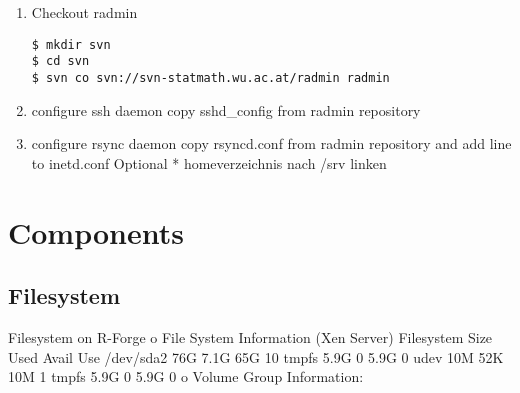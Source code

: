\documentclass[a4paper]{article}
\begin{document}
\begin{enumerate}
	\item Checkout radmin
\medskip

\begin{lstlisting}[frame=single, framerule=0.95pt]
$ mkdir svn
$ cd svn
$ svn co svn://svn-statmath.wu.ac.at/radmin radmin
\end{lstlisting}

       \item configure ssh daemon 
copy sshd\_config from radmin repository
       \item configure rsync daemon 
copy rsyncd.conf from radmin repository and add line to inetd.conf
Optional * homeverzeichnis nach /srv linken
\end{enumerate}
\section{Components}
\label{sec:registration}
\subsection{Filesystem}
Filesystem on R-Forge 
o File System Information (Xen Server)
		Filesystem            Size  Used Avail Use%
		/dev/sda2              76G  7.1G   65G  10%
		tmpfs                 5.9G     0  5.9G   0%
		udev                   10M   52K   10M   1%
		tmpfs                 5.9G     0  5.9G   0%
	o Volume Group Information:
\end{document}
